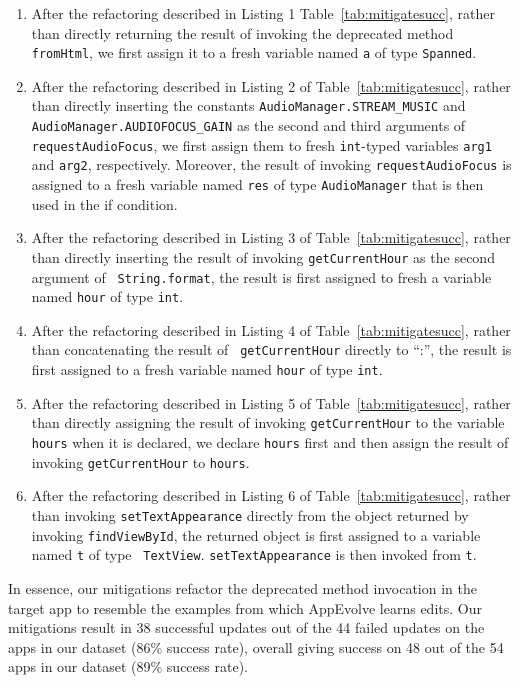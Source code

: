 \begin{enumerate}
\item After the refactoring described in Listing 1
Table~\ref{tab:mitigatesucc}, rather than directly returning the result of
invoking the deprecated method {\tt fromHtml}, we first assign it to a fresh
variable named {\tt a} of type {\tt Spanned}.

\item After the refactoring described in Listing 2 of
Table~\ref{tab:mitigatesucc}, rather than directly inserting the constants
{\tt AudioManager.STREAM\_MUSIC} and {\tt AudioManager.AUDIOFOCUS\_GAIN} as
the second and third arguments of {\tt requestAudioFocus}, we first assign
them to fresh {\tt int}-typed variables {\tt arg1} and {\tt arg2},
respectively. Moreover, the result of invoking {\tt requestAudioFocus} is
assigned to a fresh variable named {\tt res} of type {\tt AudioManager}
that is then used in the if condition.

\item After the refactoring described in Listing 3 of
Table~\ref{tab:mitigatesucc}, rather than directly inserting the result of
invoking {\tt getCurrentHour} as the second argument of {\tt
String.format}, the result is first assigned to fresh a variable named {\tt hour}
of type {\tt int}.

\item After the refactoring described in Listing 4 of
Table~\ref{tab:mitigatesucc}, rather than concatenating the result of {\tt
getCurrentHour} directly to ``:'', the result is first assigned to a fresh
variable named {\tt hour} of type {\tt int}.

\item After the refactoring described in Listing 5 of
Table~\ref{tab:mitigatesucc}, rather than directly assigning the result of
invoking {\tt getCurrentHour} to the variable {\tt hours} when it is
declared, we declare {\tt hours} first and then assign the result of
invoking {\tt getCurrentHour} to {\tt hours}.

\item After the refactoring described in Listing 6 of
Table~\ref{tab:mitigatesucc}, rather than invoking {\tt setTextAppearance}
directly from the object returned by invoking {\tt findViewById}, the
returned object is first assigned to a variable named {\tt t} of type {\tt
TextView}. {\tt setTextAppearance} is then invoked from {\tt t}.

\end{enumerate}

In essence, our mitigations refactor the deprecated method invocation in
the target app to resemble the examples from which AppEvolve learns
edits. Our mitigations result in 38 successful updates out of the 44 failed
updates on the apps in our dataset (86\% success rate), overall giving
success on 48 out of the 54 apps in our dataset (89\% success rate).
